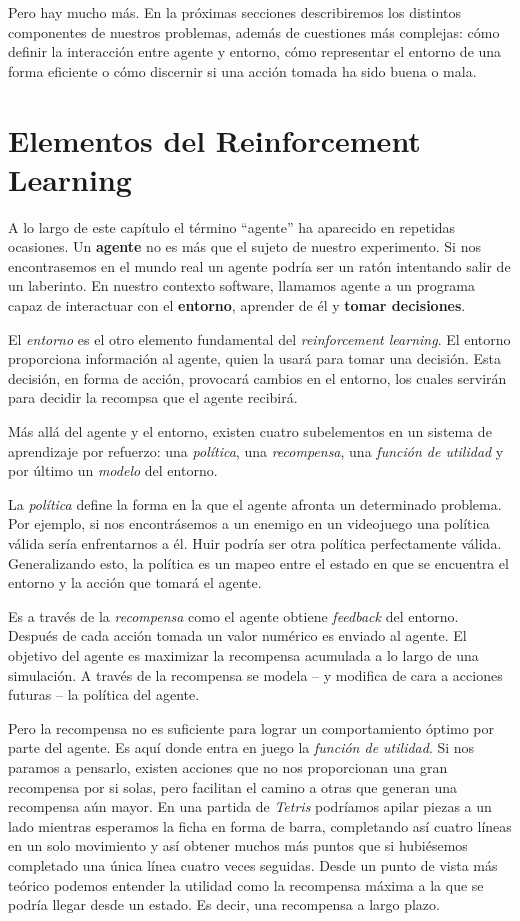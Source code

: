 Pero hay mucho más. En la próximas secciones describiremos los distintos componentes de nuestros problemas, además de cuestiones más complejas: cómo definir la interacción entre agente y entorno, cómo representar el entorno de una forma eficiente o cómo discernir si una acción tomada ha sido buena o mala.

\section{Elementos del Reinforcement Learning}
A lo largo de este capítulo el término ``agente'' ha aparecido en repetidas ocasiones. Un \textbf{agente} no es más que el sujeto de nuestro experimento. Si nos encontrasemos en el mundo real un agente podría ser un ratón intentando salir de un laberinto. En nuestro contexto software, llamamos agente a un programa capaz de interactuar con el \textbf{entorno}, aprender de él y \textbf{tomar decisiones}.

El \textit{entorno} es el otro elemento fundamental del \textit{reinforcement learning}. El entorno proporciona información al agente, quien la usará para tomar una decisión. Esta decisión, en forma de acción, provocará cambios en el entorno, los cuales servirán para decidir la recompsa que el agente recibirá.

Más allá del agente y el entorno, existen cuatro subelementos en un sistema de aprendizaje por refuerzo: una \textit{política}, una \textit{recompensa}, una \textit{función de utilidad} y por último un \textit{modelo} del entorno.

La \textit{política} define la forma en la que el agente afronta un determinado problema. Por ejemplo, si nos encontrásemos a un enemigo en un videojuego una política válida sería enfrentarnos a él. Huir podría ser otra política perfectamente válida. Generalizando esto, la política es un mapeo entre el estado en que se encuentra el entorno y la acción que tomará el agente.

Es a través de la \textit{recompensa} como el agente obtiene \textit{feedback} del entorno. Después de cada acción tomada un valor numérico es enviado al agente. El objetivo del agente es maximizar la recompensa acumulada a lo largo de una simulación. A través de la recompensa se modela – y modifica de cara a acciones futuras – la política del agente.

Pero la recompensa no es suficiente para lograr un comportamiento óptimo por parte del agente. Es aquí donde entra en juego la \textit{función de utilidad}. Si nos paramos a pensarlo, existen acciones que no nos proporcionan una gran recompensa por si solas, pero facilitan el camino a otras que generan una recompensa aún mayor. En una partida de \textit{Tetris} podríamos apilar piezas a un lado mientras esperamos la ficha en forma de barra, completando así cuatro líneas en un solo movimiento y así obtener muchos más puntos que si hubiésemos completado una única línea cuatro veces seguidas. Desde un punto de vista más teórico podemos entender la utilidad como la recompensa máxima a la que se podría llegar desde un estado. Es decir, una recompensa a largo plazo.

